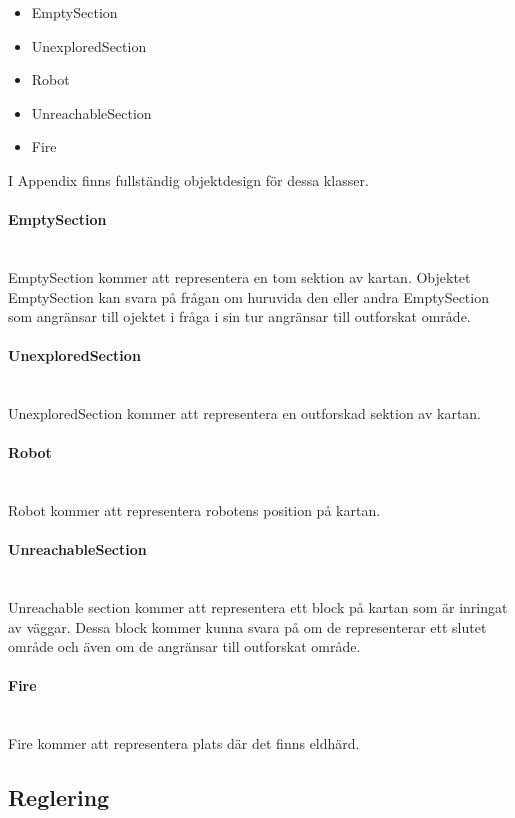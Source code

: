 \documentclass[a4paper,12pt,fleqn]{article}
\begin{document}
\begin{itemize}
\item{EmptySection}
\item{UnexploredSection}
\item{Robot}
\item{UnreachableSection}
\item{Fire}
\end{itemize}

I Appendix finns fullständig objektdesign för dessa klasser. 

\paragraph{EmptySection} 
~\\
EmptySection kommer att representera en tom sektion av kartan. Objektet EmptySection kan svara på frågan om huruvida den eller andra EmptySection som angränsar till ojektet i fråga i sin tur angränsar till outforskat område. 

\paragraph{UnexploredSection} 
~\\
UnexploredSection kommer att representera en outforskad sektion av kartan. 

\paragraph{Robot} 
~\\
Robot kommer att representera robotens position på kartan. 

\paragraph{UnreachableSection} 
~\\
Unreachable section kommer att representera ett block på kartan som är inringat av väggar. Dessa block kommer kunna svara på om de representerar ett slutet område och även om de angränsar till outforskat område. 

\paragraph{Fire} 
~\\
Fire kommer att representera plats där det finns eldhärd. 

\subsection{Reglering}
\end{document}
